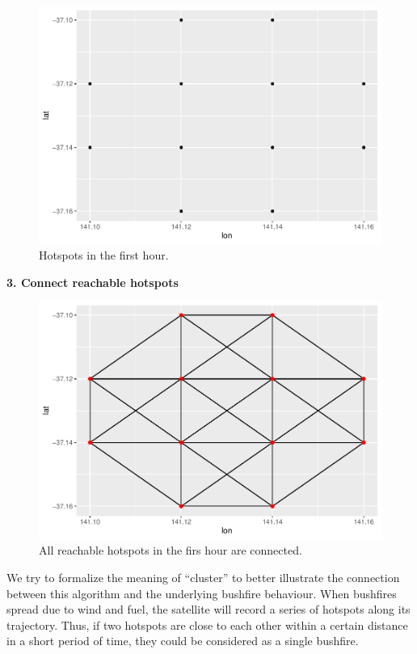 \begin{Schunk}
\begin{figure}
\includegraphics[width=0.8\linewidth]{clustering_paper_files/figure-latex/step2-1} \caption[Hotspots in the first hour]{Hotspots in the first hour.}\label{fig:step2}
\end{figure}
\end{Schunk}

\textbf{3. Connect reachable hotspots}

\begin{Schunk}
\begin{figure}
\includegraphics[width=0.8\linewidth]{clustering_paper_files/figure-latex/step3-1} \caption[All reachable hotspots in the firs hour are connected]{All reachable hotspots in the firs hour are connected.}\label{fig:step3}
\end{figure}
\end{Schunk}

We try to formalize the meaning of ``cluster'' to better illustrate the
connection between this algorithm and the underlying bushfire behaviour.
When bushfires spread due to wind and fuel, the satellite will record a
series of hotspots along its trajectory. Thus, if two hotspots are close
to each other within a certain distance in a short period of time, they
could be considered as a single bushfire.

